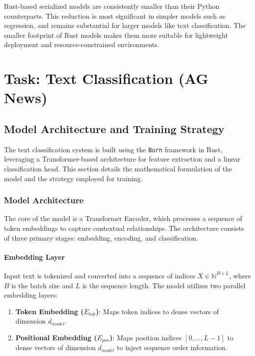 \documentclass[10pt,a4paper,twocolumn]{article}
\begin{document}
\noindent
Rust-based serialized models are consistently smaller than their Python counterparts. This reduction is most significant in simpler models such as regression, and remains substantial for larger models like text classification. The smaller footprint of Rust models makes them more suitable for lightweight deployment and resource-constrained environments.

\clearpage

\section{Task: Text Classification (AG News)}
\subsection{Model Architecture and Training Strategy}

The text classification system is built using the \texttt{Burn} framework in Rust, leveraging a Transformer-based architecture for feature extraction and a linear classification head. This section details the mathematical formulation of the model and the strategy employed for training.

\subsubsection{Model Architecture}
The core of the model is a Transformer Encoder, which processes a sequence of token embeddings to capture contextual relationships. The architecture consists of three primary stages: embedding, encoding, and classification.

\paragraph{Embedding Layer}
Input text is tokenized and converted into a sequence of indices $X \in \mathbb{N}^{B \times L}$, where $B$ is the batch size and $L$ is the sequence length. The model utilizes two parallel embedding layers:
\begin{enumerate}
    \item \textbf{Token Embedding ($E_{tok}$)}: Maps token indices to dense vectors of dimension $d_{model}$.
    \item \textbf{Positional Embedding ($E_{pos}$)}: Maps position indices $[0, \dots, L-1]$ to dense vectors of dimension $d_{model}$ to inject sequence order information.
\end{enumerate}
\end{document}
